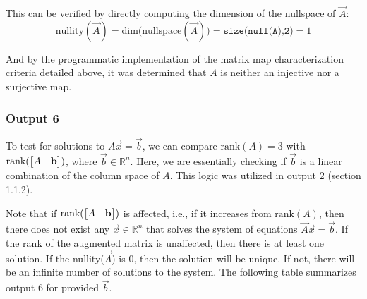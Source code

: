 \documentclass[10pt]{article}
\begin{document}
This can be verified by directly computing the dimension of the nullspace of $\vec{A}$:
\begin{equation*}
    \text{nullity}(\vec{A}) = \text{dim(nullspace}(\vec{A})) = \texttt{size(null(A),2)} = 1
\end{equation*}

And by the programmatic implementation of the matrix map characterization criteria detailed above, it was determined that $A$ is neither an injective nor a surjective map.

\subsubsection{Output 6}
To test for solutions to $A\vec{x} = \vec{b}$, we can compare $\text{rank}(A) = 3$ with $\text{rank}(\begin{bmatrix} A & \mathbf{b} \end{bmatrix})$, where $\vec{b} \in \mathbb{R}^n$. Here, we are essentially checking if $\vec{b}$ is a linear combination of the column space of $A$. This logic was utilized in output 2 (section 1.1.2).

Note that if $\text{rank}(\begin{bmatrix} A & \mathbf{b} \end{bmatrix})$ is affected, i.e., if it increases from $\text{rank}(A)$, then there does not exist any $\vec{x}\in \mathbb{R}^n$ that solves the system of equations $\vec{A}\vec{x} = \vec{b}$. If the rank of the augmented matrix is unaffected, then there is at least one solution. If the nullity($\vec{A}$) is $0$, then the solution will be unique. If not, there will be an infinite number of solutions to the system. The following table summarizes output 6 for provided $\vec{b}$.
\end{document}
